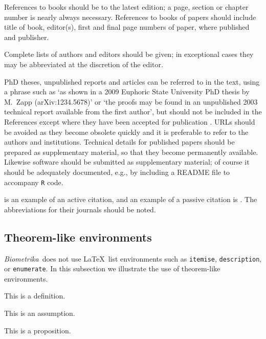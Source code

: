 \documentclass[article,lineno]{biometrika}
\def\Bka{{\it Biometrika}}
\begin{document}
References to books should be to the latest edition; a page, section or chapter number
is nearly always necessary. References to books of papers should include title of book,
editor(s), first and final page numbers of paper, where published and publisher.

Complete lists of authors and editors should be given; in exceptional cases they may be abbreviated at the discretion of the editor.

PhD theses, unpublished reports and articles can be referred to in the text, using a
phrase such as `as shown in a 2009 Euphoric State University PhD thesis by M.~Zapp
(arXiv:1234.5678)' or `the proofs may be found in an unpublished 2003 technical
report available from the first author', but should not be included in the
References except where they have been accepted for publication \citep{Berrendero.etal:2015}. URLs should be
avoided as they become obsolete quickly and it is preferable to refer to the authors
and institutions.  Technical details for published papers should be prepared as
supplementary material, so that they become permanently available. Likewise software
should be submitted as supplementary material; of course it should be adequately
documented, e.g., by including a README file to accompany \texttt{R} code.

\citet{Cox:1972} is an example of an active citation, and an example of a passive citation is  \citep{Hear:Holm:Step:quan:2006}.  The abbreviations for their journals should be noted.

\subsection{Theorem-like environments}

\Bka\ does not use \LaTeX\ list environments such as \texttt{itemise}, \texttt{description}, or \texttt{enumerate}.
In this subsection we illustrate the use of theorem-like environments.

\begin{definition}
This is a definition.
\end{definition}

\begin{assumption}
\label{assumptionA}
This is an assumption.
\end{assumption}

\begin{proposition}
This is a proposition.
\end{proposition}
\end{document}
